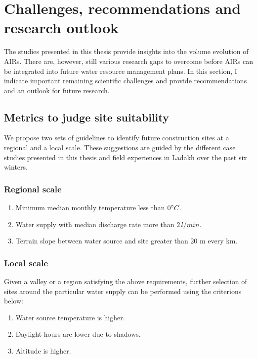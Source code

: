 \section{Challenges, recommendations and research outlook}

The studies presented in this thesis provide insights into the volume evolution of \ac{AIRs}. There are,
however, still various research gaps to overcome before \ac{AIRs} can be integrated into future water resource
management plans. In this section, I indicate important remaining scientific challenges and provide
recommendations and an outlook for future research.

\subsection{Metrics to judge site suitability}

We propose two sets of guidelines to identify future construction sites at a regional and a local scale. These
suggestions are guided by the different case studies presented in this thesis and field experiences in
Ladakh over the past six winters.

\subsubsection{Regional scale}

\begin{enumerate}

	\item Minimum median monthly temperature less than $0 ^{\circ} C$.
	\item Water supply with median discharge rate more than $2\, l/min$.
	\item Terrain slope between water source and site greater than 20 m every km.

\end{enumerate}

\subsubsection{Local scale}

Given a valley or a region satisfying the above requirements, further selection of sites around the particular
water supply can be performed using the criterions below:

\begin{enumerate}
	\item Water source temperature is higher.
	\item Daylight hours are lower due to shadows.
	\item Altitude is higher.
\end{enumerate}

